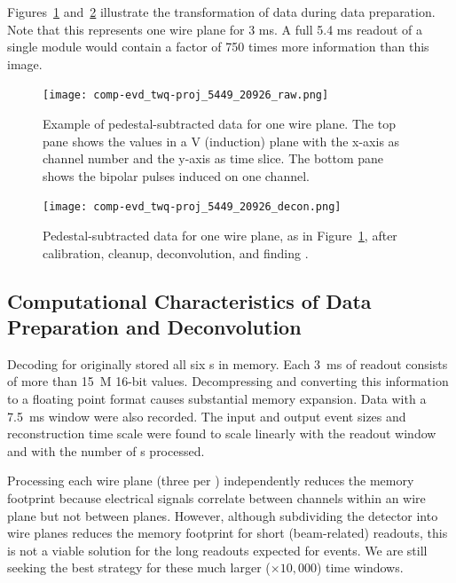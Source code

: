 Figures~\ref{fig:ch-exec-comp-chtraw} and~\ref{fig:ch-exec-comp-chtroi} illustrate the transformation of  data  during data preparation. Note that this represents one wire plane for 3 ms.  A full 5.4 ms readout of a single \nominalmodsize module would contain a factor of 750 times %
more information than this image.

\begin{figure}[t]
\texttt{[image: comp-evd\_twq-proj\_5449\_20926\_raw.png]}
\caption[Example of pedestal-subtracted data for one of the ProtoDUNE-SP  wire planes]{Example of pedestal-subtracted data for one   wire plane.  The top pane shows the  values in a V (induction) plane with the x-axis as channel number and the y-axis as time slice. The bottom pane shows the bipolar pulses induced on one channel. 
}
\label{fig:ch-exec-comp-chtraw}
\end{figure}


\begin{figure}[t]
 \texttt{[image: comp-evd\_twq-proj\_5449\_20926\_decon.png]}
\caption[Pedestal-subtracted data for one of the ProtoDUNE-SP  wire planes, additional processing]{
Pedestal-subtracted data for one  wire plane, as in Figure~\ref{fig:ch-exec-comp-chtraw}, after calibration, cleanup, deconvolution, and finding . 
}
\label{fig:ch-exec-comp-chtroi}
\end{figure}


\subsection{Computational Characteristics of Data Preparation and Deconvolution }

Decoding for  originally stored all six s in memory. Each \SI{3}{ms} of  readout consists of more than \SI{15}{M} 16-bit values. Decompressing and converting this information to a floating point format causes substantial memory expansion. 
  Data with a \SI{7.5}{ms} window were also recorded. 
The input and output event sizes and reconstruction time scale were found to scale linearly with the readout window and with the number of s processed. 

Processing each wire plane (three per ) independently reduces the memory footprint because electrical signals correlate between channels within an  wire plane but not between planes.
However,  although subdividing the detector into wire planes reduces the memory footprint for short (beam-related) readouts, this is  not a viable solution for the long readouts expected for  events. We are still seeking the best strategy for these much larger ($\times 10,000$) time windows. 

